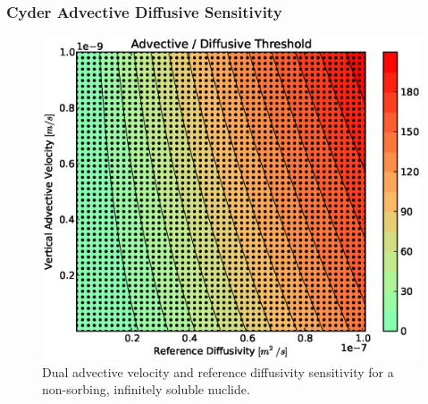 \begin{frame}[ctb!]
\frametitle{Cyder Advective Diffusive Sensitivity}
\begin{figure}[ht]
\centering
\includegraphics[height=0.7\textheight]{./nuclide_demonstration/adv_vel_diff.eps}
\caption[Advection vs. Diffusion Sensitivity in Cyder]{Dual advective velocity 
and reference diffusivity sensitivity for a non-sorbing, infinitely soluble 
nuclide.}
\label{fig:dr_adv_diff}
\end{figure}
\end{frame}
